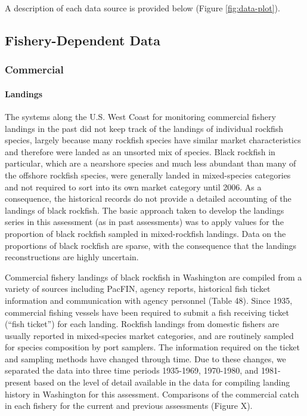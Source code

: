 \documentclass[11pt,
  english,
  letterpaper,
]{article}
\begin{document}
A description of each data source is provided below (Figure \ref{fig:data-plot}).

\hypertarget{fishery-dependent-data}{%
\subsection{Fishery-Dependent Data}\label{fishery-dependent-data}}

\hypertarget{commercial}{%
\subsubsection{Commercial}\label{commercial}}

\hypertarget{landings}{%
\paragraph{Landings}\label{landings}}

The systems along the U.S. West Coast for monitoring commercial fishery landings in the past did not keep track of the landings of individual rockfish species, largely because many rockfish species have similar market characteristics and therefore were landed as an unsorted mix of species. Black rockfish in particular, which are a nearshore species and much less abundant than many of the offshore rockfish species, were generally landed in mixed-species categories and not required to sort into its own market category until 2006. As a consequence, the historical records do not provide a detailed accounting of the landings of black rockfish. The basic approach taken to develop the landings series in this assessment (as in past assessments) was to apply values for the proportion of black rockfish sampled in mixed-rockfish landings. Data on the proportions of black rockfish are sparse, with the consequence that the landings reconstructions are highly uncertain.

Commercial fishery landings of black rockfish in Washington are compiled from a variety of sources including PacFIN, agency reports, historical fish ticket information and communication with agency personnel (Table 48). Since 1935, commercial fishing vessels have been required to submit a fish receiving ticket (``fish ticket'') for each landing. Rockfish landings from domestic fishers are usually reported in mixed-species market categories, and are routinely sampled for species composition by port samplers. The information required on the ticket and sampling methods have changed through time. Due to these changes, we separated the data into three time periods 1935-1969, 1970-1980, and 1981-present based on the level of detail available in the data for compiling landing history in Washington for this assessment. Comparisons of the commercial catch in each fishery for the current and previous assessments (Figure X).
\end{document}
